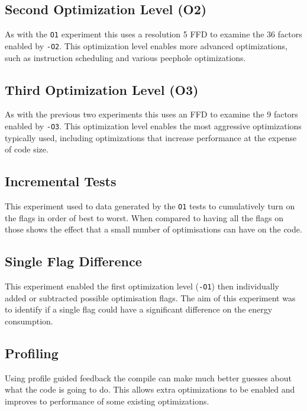 \documentclass[twocolumn]{article}
\begin{document}
\subsection*{Second Optimization Level (O2)}

As with the \texttt{O1} experiment this uses a resolution 5 FFD to examine the 36 factors enabled by \texttt{-O2}. This optimization level enables more advanced optimizations, such as instruction scheduling and various peephole optimizations.

\subsection*{Third Optimization Level (O3)}

As with the previous two experiments this uses an FFD to examine the 9 factors enabled by \texttt{-O3}. This optimization level enables the most aggressive optimizations typically used, including optimizations that increase performance at the expense of code size.

\subsection*{Incremental Tests}

This experiment used to data generated by the \texttt{O1} tests to cumulatively turn on the flags in order of best to worst. When compared to having all the flags on those shows the effect that a small number of optimisations can have on the code.

\subsection*{Single Flag Difference}

This experiment enabled the first optimization level (\texttt{-O1}) then individually added or subtracted possible optimisation flags. The aim of this experiment was to identify if a single flag could have a significant difference on the energy consumption.

\subsection*{Profiling}

Using profile guided feedback the compile can make much better guesses about what the code is going to do. This allows extra optimizations to be enabled and improves to performance of some existing optimizations.
\end{document}
